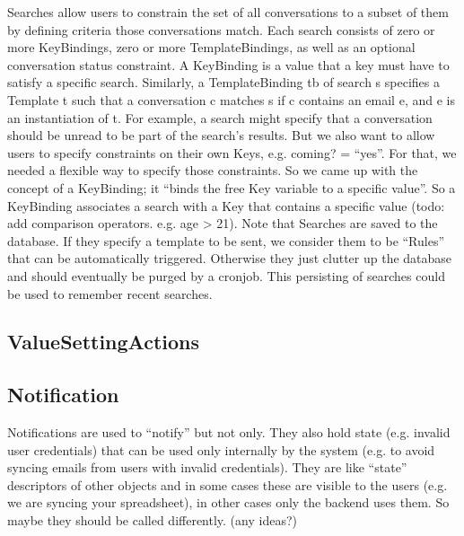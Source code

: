 Searches allow users to constrain the set of all conversations to a subset of them by defining criteria those conversations match. Each search consists of zero or more KeyBindings, zero or more TemplateBindings, as well as an optional conversation status constraint. A KeyBinding is a value that a key must have to satisfy a specific search. Similarly, a TemplateBinding tb of search s specifies a Template t such that a conversation c matches s if c contains an email e, and e is an instantiation of t.
For example, a search might specify that a conversation should be unread to be part of the search’s results. But we also want to allow users to specify constraints on their own Keys, e.g. coming? = “yes”. For that, we needed a flexible way to specify those constraints. So we came up with the concept of a KeyBinding; it “binds the free Key variable to a specific value”. So a KeyBinding associates a search with a Key that contains a specific value (todo: add comparison operators. e.g. age > 21).
Note that Searches are saved to the database. If they specify a template to be sent, we consider them to be “Rules” that can be automatically triggered. Otherwise they just clutter up the database and should eventually be purged by a cronjob. This persisting of searches could be used to remember recent searches.

\pagebreak
\subsection{ValueSettingActions}


\subsection{Notification}

Notifications are used to “notify” but not only. They also hold state (e.g. invalid user credentials) that can be used only internally by the system (e.g. to avoid syncing emails from users with invalid credentials). They are like “state” descriptors of other objects and in some cases these are visible to the users (e.g. we are syncing your spreadsheet), in other cases only the backend uses them. So maybe they should be called differently. (any ideas?)

